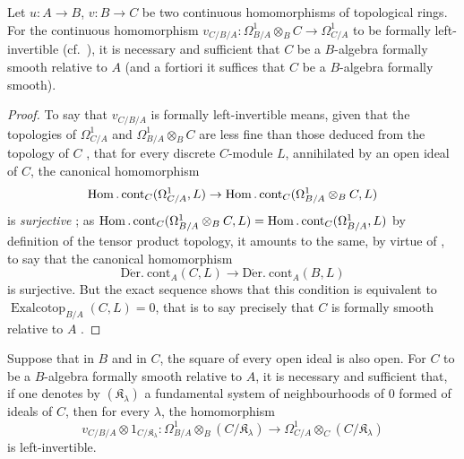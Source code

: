\begin{proposition}[20.7.2]
\label{0.20.7.2}
Let $u:A\to B$, $v:B\to C$ be two continuous homomorphisms of topological rings.
For the continuous homomorphism $v_{C/B/A}:\Omega^1_{B/A}\otimes_B C\to\Omega^1_{C/A}$ to be formally left-invertible \textup{(}cf.\ \textup{)}, it is necessary and sufficient that $C$ be a $B$-algebra formally smooth relative to $A$  \textup{(and} a fortiori \textup{it suffices that $C$ be a $B$-algebra formally smooth)}.
\end{proposition}

\begin{proof}
To say that $v_{C/B/A}$ is formally left-invertible means, given that the topologies of $\Omega^1_{C/A}$ and $\Omega^1_{B/A}\otimes_B C$ are less fine than those deduced from the topology of $C$ , that for every discrete $C$-module $L$, annihilated by an open ideal of $C$, the canonical homomorphism
\[
  \operatorname{Hom}.\operatorname{cont}_C(\Omega^1_{C/A},L)\to\operatorname{Hom}.\operatorname{cont}_C(\Omega^1_{B/A}\otimes_B C,L)
\]
is \emph{surjective} ; as $\operatorname{Hom}.\operatorname{cont}_C(\Omega^1_{B/A}\otimes_B C,L)=\operatorname{Hom}.\operatorname{cont}_C(\Omega^1_{B/A},L)$ by definition of the tensor product topology, it amounts to the same, by virtue of , to say that the canonical homomorphism
\[
  \operatorname{D\acute{e}r.\ cont}_A(C,L)\to\operatorname{D\acute{e}r.\ cont}_A(B,L)
\]
is surjective.
But the exact sequence  shows that this condition is equivalent to $\operatorname{Exalcotop}_{B/A}(C,L)=0$, that is to say precisely that $C$ is formally smooth relative to $A$ .
\end{proof}

\begin{corollary}[20.7.3]
\label{0.20.7.3}
Suppose that in $B$ and in $C$, the square of every open ideal is also open.
For $C$ to be a $B$-algebra formally smooth relative to $A$, it is necessary and sufficient that, if one denotes by $(\mathfrak{K}_\lambda)$ a fundamental system of neighbourhoods of $0$ formed of ideals of $C$, then for every $\lambda$, the homomorphism
\begin{equation}
\tag{20.7.3.1}
  \label{0.20.7.3.1}
  v_{C/B/A}\otimes 1_{C/\mathfrak{K}_\lambda}:\Omega^1_{B/A}\otimes_B(C/\mathfrak{K}_\lambda)\to\Omega^1_{C/A}\otimes_C(C/\mathfrak{K}_\lambda)
\end{equation}
is left-invertible.
\end{corollary}

